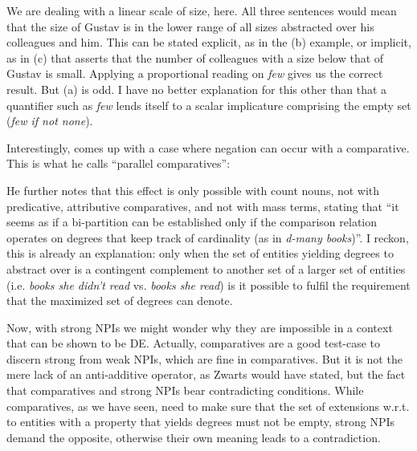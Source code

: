 \documentclass[output=paper,colorlinks,citecolor=brown,
]{langscibook}
\begin{document}
  \begin{exe}
    \ex
    \begin{xlist}
    \end{xlist}
  \end{exe}

We are dealing with a linear scale of size, here. All three sentences would mean that the size of Gustav is in the
lower range of all sizes abstracted over his colleagues and him. This can be stated explicit, as in the (b) example,
or implicit, as in (c) that asserts that the number of colleagues with a size below that of Gustav is small. Applying
a proportional reading on \textit{few} gives us the correct result. But (a) is odd. I have no better explanation for
this other than that a quantifier such as \textit{few} lends itself to a scalar implicature comprising the empty set
(\textit{few if not none}).

Interestingly, \citet[12]{lechner2002} comes up with a case where negation can occur with a comparative. This is what
he calls “parallel comparatives”:

\begin{exe}
\end{exe}

He further notes that this effect is only possible with count nouns, not with predicative, attributive comparatives,
and not with mass terms, stating that ``it seems as if a bi-partition can be established only if the comparison
relation operates on degrees that keep track of cardinality (as in \textit{d-many books})''. I reckon, this is already
an explanation: only when the set of entities yielding degrees to abstract over is a contingent complement to another
set of a larger set of entities (i.e. \textit{books she didn't read} vs. \textit{books she read}) is it possible to
fulfil the requirement that the maximized set of degrees can denote.

Now, with strong NPIs we might wonder why they are impossible in a context that can be shown to be DE. Actually,
comparatives are a good test-case to discern strong from weak NPIs, which are fine in comparatives. But it is not the
mere lack of an anti-additive operator, as Zwarts would have stated, but the fact that comparatives and strong NPIs
bear contradicting conditions. While comparatives, as we have seen, need to make sure that the set of extensions w.r.t.
to entities with a property that yields degrees must not be empty, strong NPIs demand the opposite, otherwise their
own meaning leads to a contradiction.
\end{document}
